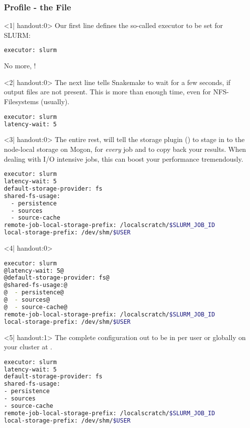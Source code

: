 \begin{frame}[fragile]
  \frametitle{\Snakemake{} Profile - the File}
    \begin{onlyenv}<1| handout:0>
      Our first line defines the so-called executor to be set for SLURM:
      \begin{lstlisting}[language=Bash, style=Shell]
executor: slurm
     \end{lstlisting}
     No more, !
   \end{onlyenv}
   \begin{onlyenv}<2| handout:0>
   	 The next line tells Snakemake to wait for a few seconds, if output files are not present. This is more than enough time, even for NFS-Filesystems (usually). 
   	 \begin{lstlisting}[language=Bash, style=Shell]
executor: slurm
latency-wait: 5
   	 \end{lstlisting}
    \end{onlyenv}
    \begin{onlyenv}<3| handout:0>
      The entire rest, will tell the storage plugin () to stage in to the node-local storage on Mogon, for \emph{every} job and to copy back your results. When dealing with I/O intensive jobs, this can boost your performance tremendously. 
      \begin{lstlisting}[language=Bash, style=Shell]
executor: slurm
latency-wait: 5
default-storage-provider: fs
shared-fs-usage:
  - persistence
  - sources
  - source-cache
remote-job-local-storage-prefix: /localscratch/$SLURM_JOB_ID
local-storage-prefix: /dev/shm/$USER
    \end{lstlisting}
   \end{onlyenv}
  \begin{onlyenv}<4| handout:0>
  	
  	\begin{lstlisting}[language=Bash, style=Shell]
executor: slurm
@latency-wait: 5@
@default-storage-provider: fs@
@shared-fs-usage:@
@  - persistence@
@  - sources@
@  - source-cache@
remote-job-local-storage-prefix: /localscratch/$SLURM_JOB_ID 
local-storage-prefix: /dev/shm/$USER 
     \end{lstlisting}
  \end{onlyenv}
   \begin{onlyenv}<5| handout:1>
   	The complete configuration out to be in  per user or globally on your cluster at .
   	\begin{lstlisting}[language=Bash, style=Shell]
executor: slurm
latency-wait: 5
default-storage-provider: fs
shared-fs-usage:
- persistence
- sources
- source-cache
remote-job-local-storage-prefix: /localscratch/$SLURM_JOB_ID
local-storage-prefix: /dev/shm/$USER
    \end{lstlisting}
  \end{onlyenv}
\end{frame}


